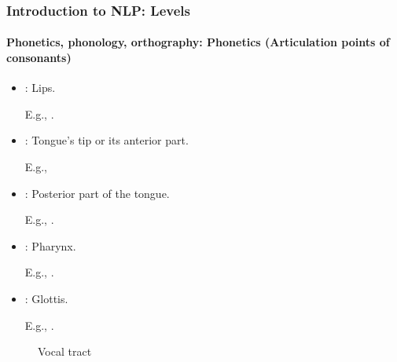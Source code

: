 \documentclass[xcolor=table]{beamer}
\begin{document}
\begin{frame}
\frametitle{Introduction to NLP: Levels}
\framesubtitle{Phonetics, phonology, orthography: Phonetics (Articulation points of consonants)}

\begin{minipage}{0.55\textwidth}
\begin{itemize}
	\item {}: Lips. 
	
	E.g., \expword{\textipa{[b], [p], [m], [f], [v]}}.
	
	\item {}: Tongue's tip or its anterior part. 
	
	E.g., 

	\item {}: Posterior part of the tongue. 
	
	E.g., .
	
	\item {}: Pharynx. 
	
	E.g., .
	
	\item {}: Glottis. 
	
	E.g., .
\end{itemize}
\end{minipage}
\begin{minipage}{0.43\textwidth}
	\begin{figure}
		\caption{Vocal tract \cite{2009-ball}}
	\end{figure}
\end{minipage}

\end{frame}
\end{document}
